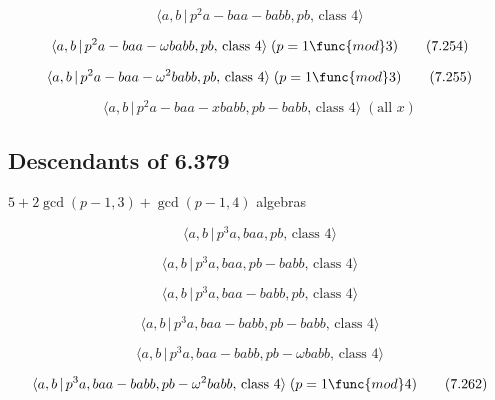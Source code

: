 \documentclass[10pt]{article}
\begin{document}
\begin{equation}
\langle a,b\,|\,p^2a-baa-babb,pb,\,\text{class }4\rangle  \tag{7.253}
\end{equation}

\begin{equation}
\langle a,b\,|\,p^{2}a-baa-\omega babb,pb,\,\text{class }4\rangle \;(p=1%
\func{mod}3)  \tag{7.254}
\end{equation}

\begin{equation}
\langle a,b\,|\,p^{2}a-baa-\omega ^{2}babb,pb,\,\text{class }4\rangle \;(p=1%
\func{mod}3)  \tag{7.255}
\end{equation}

\begin{equation}
\langle a,b\,|\,p^2a-baa-xbabb,pb-babb,\,\text{class }4\rangle \;(\text{all }%
x)  \tag{7.256}
\end{equation}

\subsection{Descendants of 6.379}

$5+2\gcd (p-1,3)+\gcd (p-1,4)$ algebras

\begin{equation}
\langle a,b\,|\,p^3a,baa,pb,\,\text{class }4\rangle  \tag{7.257}
\end{equation}

\begin{equation}
\langle a,b\,|\,p^3a,baa,pb-babb,\,\text{class }4\rangle  \tag{7.258}
\end{equation}

\begin{equation}
\langle a,b\,|\,p^3a,baa-babb,pb,\,\text{class }4\rangle  \tag{7.259}
\end{equation}

\begin{equation}
\langle a,b\,|\,p^3a,baa-babb,pb-babb,\,\text{class }4\rangle  \tag{7.260}
\end{equation}

\begin{equation}
\langle a,b\,|\,p^{3}a,baa-babb,pb-\omega babb,\,\text{class }4\rangle 
\tag{7.261}
\end{equation}

\begin{equation}
\langle a,b\,|\,p^{3}a,baa-babb,pb-\omega ^{2}babb,\,\text{class }4\rangle
\;(p=1\func{mod}4)  \tag{7.262}
\end{equation}
\end{document}
